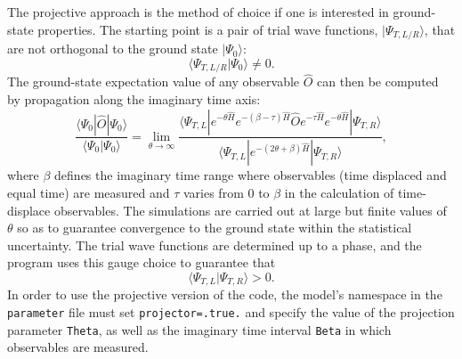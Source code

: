 


The projective approach is the method of choice if  one is interested in ground-state properties.  The starting point is a pair of trial wave functions,  $| \Psi_{T,L/R} \rangle $, that are  not orthogonal to the ground state $| \Psi_0 \rangle $:
\begin{equation}
  \langle \Psi_{T,L/R}  | \Psi_0 \rangle  \neq 0. 
\end{equation}
The ground-state expectation value of  any  observable  $\hat{O} $ can then be computed by  propagation along the imaginary time axis:
  \begin{equation}
	 \frac{ \langle \Psi_0 | \hat{O} | \Psi_0 \rangle }{ \langle \Psi_0 | \Psi_0 \rangle}   = \lim_{\theta \rightarrow \infty}  
	 \frac{ \langle \Psi_{T,L} | e^{-\theta \hat{H}}  e^{-(\beta - \tau)\hat{H}  }\hat{O} e^{- \tau  \hat{H} }   e^{-\theta \hat{H}} | \Psi_{T,R} \rangle } 
	        { \langle \Psi_{T,L} | e^{-(2 \theta + \beta) \hat{H}  } | \Psi_{T,R} \rangle } ,
\end{equation}
where $\beta$ defines the imaginary time range where observables (time displaced and equal time) are measured and $\tau$ varies from $0$ to $\beta$ in the calculation of time-displace observables.
The simulations are carried out at large  but finite values of  $\theta$ so as to guarantee convergence to the ground  state within the statistical uncertainty.
The trial wave functions are determined up to a phase, and the program uses this gauge choice to  guarantee that
\begin{equation}
	 \langle \Psi_{T,L} | \Psi_{T,R} \rangle  > 0.
\end{equation}
In order to use the projective version of the code, the model's namespace in the \texttt{parameter} file must set \texttt{projector=.true.} and specify the value of the projection parameter \texttt{Theta}, as well as the imaginary time interval \texttt{Beta} in which observables are measured.

